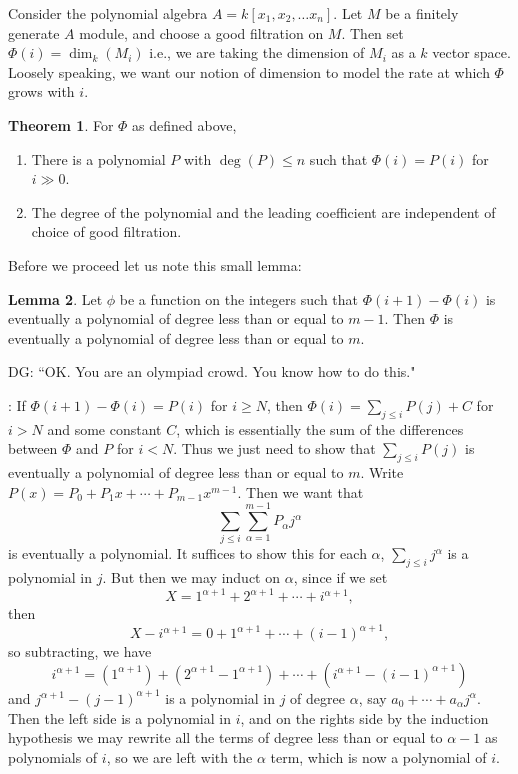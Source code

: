 \documentclass[12 pt]{article}
\theoremstyle{definition}
\newtheorem{thm}{Theorem}[section]
\newtheorem{lemma}[thm]{Lemma}
\renewcommand{\(}{\left(}
\renewcommand{\)}{\right)}
\begin{document}
Consider the polynomial algebra $A=k[x_1, x_2, \ldots x_n]$. Let $M$ be a finitely generate $A$ module, and choose a good filtration on $M$. Then set $\Phi(i)=\dim_k(M_i)$ i.e., we are taking the dimension of $M_i$ as a $k$ vector space. Loosely speaking, we want our notion of dimension to model the rate at which $\Phi$ grows with $i$.

\begin{thm} For $\Phi$ as defined above,
\begin{enumerate}
\item There is a polynomial $P$ with $\deg(P) \leq n$ such that $\Phi(i)=P(i)$ for $i \gg 0$.
\item The degree of the polynomial and the leading coefficient are independent of choice of good filtration.
\end{enumerate}
\label{hilbertdim}
\end{thm}

Before we proceed let us note this small lemma:
\begin{lemma} Let $\phi$ be a function on the integers such that $\Phi(i+1)-\Phi(i)$ is eventually a polynomial of degree less than or equal to $m-1$. Then $\Phi$ is eventually a polynomial of degree less than or equal to $m$.
\end{lemma}
DG: ``OK. You are an olympiad crowd. You know how to do this."

: If $\Phi(i+1)-\Phi(i)=P(i)$ for $i \geq N$, then $\Phi(i)=\sum_{j \leq i} P(j)+C$ for $i>N$ and some constant $C$, which is essentially the sum of the differences between $\Phi$ and $P$ for $i<N$. Thus we just need to show that $\sum_{j \leq i} P(j)$ is eventually a polynomial of degree less than or equal to $m$. Write $P(x)= P_0+P_1x+\cdots +P_{m-1}x^{m-1}$. Then we want that
\[\sum_{j \leq i} \sum_{\alpha=1}^{m-1}P_{\alpha}j^{\alpha}\]
is eventually a polynomial. It suffices to show this for each $\alpha$, $\sum_{j \leq i}j^{\alpha}$ is a polynomial in $j$. But then we may induct on $\alpha$, since if we set \[X=1^{\alpha+1}+2^{\alpha+1}+\cdots+i^{\alpha+1},\]
then
\[X-i^{\alpha+1}=0+1^{\alpha+1}+\cdots+(i-1)^{\alpha+1},\]
so subtracting, we have
\[i^{\alpha+1}=(1^{\alpha+1})+(2^{\alpha+1}-1^{\alpha+1})+\cdots+(i^{\alpha+1}-(i-1)^{\alpha+1})\]
and $j^{\alpha+1}-(j-1)^{\alpha+1}$ is a polynomial in $j$ of degree $\alpha$, say $a_0+\cdots+a_\alpha j^\alpha$. Then the left side is a polynomial in $i$, and on the rights side by the induction hypothesis we may rewrite all the terms of degree less than or equal to $\alpha-1$ as polynomials of $i$, so we are left with the $\alpha$ term, which is now a polynomial of $i$.
\end{document}
